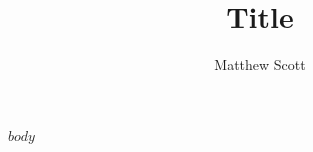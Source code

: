 \documentclass[11pt]{article}
\title{Title}
\author{ Matthew Scott
}
\begin{document}
\maketitle

%

$body$


%
\end{document}

